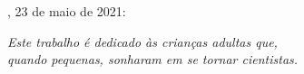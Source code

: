\documentclass[
	12pt,				%
	oneside,			%
	a4paper,			%
	chapter=TITLE,		%
	english,			%
	brazil				%
	]{abntex2}
\begin{document}

%
% 
%
\begin{folhadeaprovacao}

  \begin{center}
    {\ABNTEXchapterfont\large\MakeUppercase{\imprimirautor}}

    \vspace*{\fill}\vspace*{\fill}
    \begin{center}
      \ABNTEXchapterfont\bfseries\Large\MakeUppercase{\imprimirtitulo}
    \end{center}
    \vspace*{\fill}
    
    \imprimirtextoaprovacao
     
    \vspace*{1cm}
    
	\imprimirlocal, 23 de maio de 2021:

    \vspace*{\fill}

   \end{center}
        


      
    \vspace*{1cm}  
  
\end{folhadeaprovacao}

\begin{dedicatoria}
   \vspace*{\fill}
   \begin{flushright}
   \noindent
   \textit{ Este trabalho é dedicado às crianças adultas que,\\
   quando pequenas, sonharam em se tornar cientistas.}\vspace*{2cm}
   \end{flushright}
\end{dedicatoria}
\end{document}
